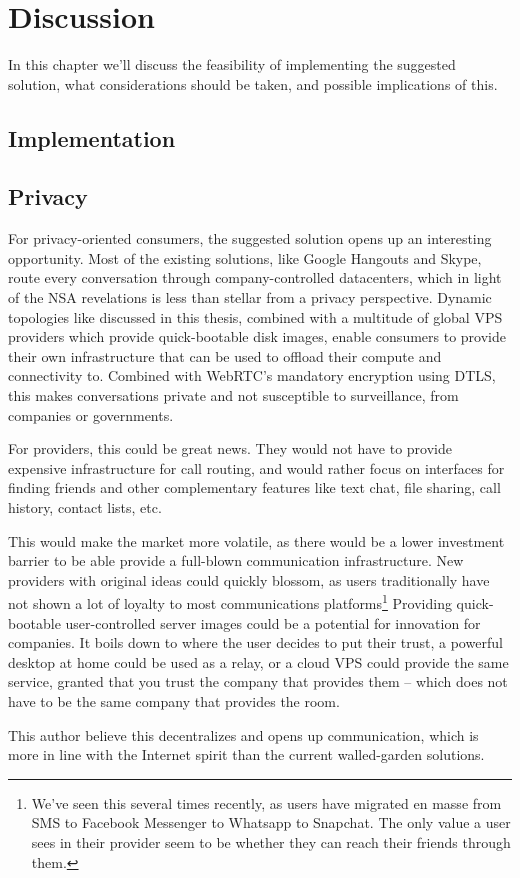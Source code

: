 \chapter{Discussion}
\label{chp:discussion}

In this chapter we'll discuss the feasibility of implementing the suggested solution, what considerations should be taken, and possible implications of this.


\section{Implementation}



\section{Privacy}

For privacy-oriented consumers, the suggested solution opens up an interesting opportunity. Most of the existing solutions, like Google Hangouts and Skype, route every conversation through company-controlled datacenters, which in light of the NSA revelations is less than stellar from a privacy perspective. Dynamic topologies like discussed in this thesis, combined with a multitude of global VPS providers which provide quick-bootable disk images, enable consumers to provide their own infrastructure that can be used to offload their compute and connectivity to. Combined with WebRTC's mandatory encryption using DTLS, this makes conversations private and not susceptible to surveillance, from companies or governments.

For providers, this could be great news. They would not have to provide expensive infrastructure for call routing, and would rather focus on interfaces for finding friends and other complementary features like text chat, file sharing, call history, contact lists, etc.

This would make the market more volatile, as there would be a lower investment barrier to be able provide a full-blown communication infrastructure. New providers with original ideas could quickly blossom, as users traditionally have not shown a lot of loyalty to most communications platforms\footnote{We've seen this several times recently, as users have migrated en masse from SMS to Facebook Messenger to Whatsapp to Snapchat. The only value a user sees in their provider seem to be whether they can reach their friends through them.} Providing quick-bootable user-controlled server images could be a potential for innovation for companies. It boils down to where the user decides to put their trust, a powerful desktop at home could be used as a relay, or a cloud VPS could provide the same service, granted that you trust the company that provides them -- which does not have to be the same company that provides the room.

This author believe this decentralizes and opens up communication, which is more in line with the Internet spirit than the current walled-garden solutions.
